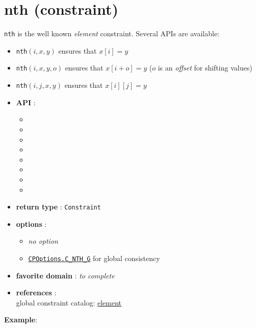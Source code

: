 \label{nth}
\hypertarget{nth}{}

\section{nth (constraint)}\label{nth:nthconstraint}\hypertarget{nth:nthconstraint}{}
\texttt{nth} is the well known \emph{element} constraint.
Several APIs are available: 
\begin{notedef}
\begin{itemize}
\item \texttt{nth}$(i,x,y)$ ensures that $x[i]=y$
\item \texttt{nth}$(i,x,y,o)$ ensures that $x[i+o]=y$ ($o$ is an \emph{offset} for shifting values)
\item \texttt{nth}$(i,j,x,y)$ ensures that $x[i][j]=y$
\end{itemize}
\end{notedef}

\begin{itemize}
	\item \textbf{API} :
	\begin{itemize}
		\item {}
		\item {}
		\item {}
		\item {}
		\item {}		
		\item {}
		\item {}
		\item {}
	\end{itemize}
	\item \textbf{return type} : \texttt{Constraint}
	\item \textbf{options} :
	\begin{itemize}
		\item \emph{no option} 
		\item \hyperlink{cnthg:cnthgoptions}{\tt CPOptions.C\_NTH\_G} for global consistency
	\end{itemize}
	\item \textbf{favorite domain} : \emph{to complete}
	\item \textbf{references} :\\
      global constraint catalog: \href{http://www.emn.fr/x-info/sdemasse/gccat/Celement.html}{element}
\end{itemize}

\textbf{Example}:
 
